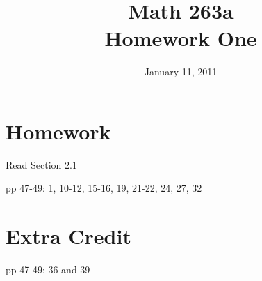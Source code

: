 \documentclass{exam}
\title{Math 263a \\ Homework One}
\date{January 11, 2011}
\begin{document}
\maketitle

\section{Homework}

\begin{itemize*}
  \item Read Section 2.1
  \item pp 47-49: 1, 10-12, 15-16, 19, 21-22, 24, 27, 32
\end{itemize*}

\section{Extra Credit}

pp 47-49: 36 and 39
\end{document}

